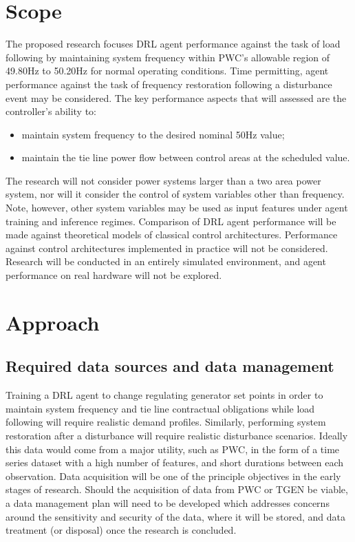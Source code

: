 \documentclass[12pt, a4paper]{article}
\begin{document}
\section{Scope}
The proposed research focuses DRL agent performance against the task of load following by maintaining system frequency within PWC's allowable region of 49.80$\si{\hertz}$ to 50.20$\si{\hertz}$ for normal operating conditions. Time permitting, agent performance against the task of frequency restoration following a disturbance event may be considered. The key performance aspects that will assessed are the controller's ability to:
\begin{itemize}
	\item maintain system frequency to the desired nominal 50$\si{\hertz}$ value;
	\item maintain the tie line power flow between control areas at the scheduled value.
\end{itemize}

The research will not consider power systems larger than a two area power system, nor will it consider the control of system variables other than frequency. Note, however, other system variables may be used as input features under agent training and inference regimes. Comparison of DRL agent performance will be made against theoretical models of classical control architectures. Performance against control architectures implemented in practice will not be considered. Research will be conducted in an entirely simulated environment, and agent performance on real hardware will not be explored.


\section{Approach}

\subsection{Required data sources and data management}
Training a DRL agent to change regulating generator set points in order to maintain system frequency and tie line contractual obligations while load following will require realistic demand profiles. Similarly, performing system restoration after a disturbance will require realistic disturbance scenarios. Ideally this data would come from a major utility, such as PWC, in the form of a time series dataset with a high number of features, and short durations between each observation. Data acquisition will be one of the principle objectives in the early stages of research. Should the acquisition of data from PWC or TGEN be viable, a data management plan will need to be developed which addresses concerns around the sensitivity and security of the data, where it will be stored, and data treatment (or disposal) once the research is concluded.\\
\end{document}
